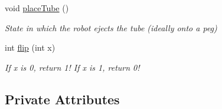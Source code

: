 \begin{DoxyCompactItemize}
void \hyperlink{class_r_j_f_r_c2011_1_1_autonomous_af0c3a743192b8ba41280999752a1e7da}{placeTube} ()
\begin{DoxyCompactList}\small\item\em State in which the robot ejects the tube (ideally onto a peg) \item\end{DoxyCompactList}\item 
int \hyperlink{class_r_j_f_r_c2011_1_1_autonomous_a71e3ba11ca9e1f84b324a785d1f7985a}{flip} (int x)
\begin{DoxyCompactList}\small\item\em If x is 0, return 1! If x is 1, return 0! \item\end{DoxyCompactList}\end{DoxyCompactItemize}
\subsection*{Private Attributes}
